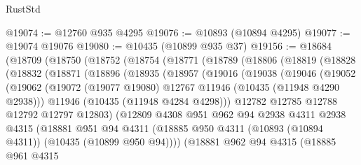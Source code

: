\begin{lexlean}{RustStd}
\begin{coremodule}
{\begin{coremodule}
{{{{{{{{{{{{{{{{{{{{{{{{{{{{{{{{{{{{{{{{{{{{{{{{{{{{{{{{{{{{{{{{{{{{{{{{{{{{{{@19074 := @12760 @935 @4295
@19076 := @10893 (@10894 @4295)
@19077 := @19074 @19076
@19080 := @10435 (@10899 @935 @37)
@19156 := @18684
    (@18709
      (@18750
        (@18752
          (@18754
            (@18771
              (@18789
                (@18806
                  (@18819
                    (@18828
                      (@18832
                        (@18871
                          (@18896
                            (@18935
                              (@18957
                                (@19016
                                  (@19038
                                    (@19046
                                      (@19052
                                        (@19062
                                          (@19072
                                            (@19077 @19080)
                                            @12767
                                            @11946
                                            (@10435 (@11948 @4290 @2938)))
                                          @11946
                                          (@10435 (@11948 @4284 @4298)))
                                        @12782
                                        @12785
                                        @12788
                                        @12792
                                        @12797
                                        @12803)
                                      (@12809
                                        @4308
                                        @951
                                        @962
                                        @94
                                        @2938
                                        @4311
                                        @2938
                                        @4315
                                        (@18881
                                          @951
                                          @94
                                          @4311
                                          (@18885
                                            @950
                                            @4311
                                            (@10893 (@10894 @4311))
                                            (@10435 (@10899 @950 @94))))
                                        (@18881
                                          @962
                                          @94
                                          @4315
                                          (@18885
                                            @961
                                            @4315
}}}}}}}}}}}}}}}}}}}}}}}}}}}}}}}}}}}}}}}}}}}}}}}}}}}}}}}}}}}}}}}}}}}}}}}}}}}}}}
\end{coremodule}}
\end{coremodule}
\end{lexlean}
